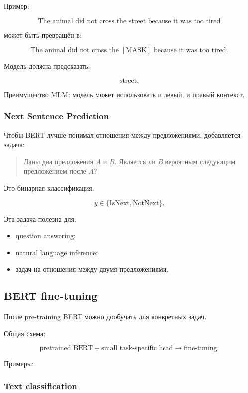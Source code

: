 \documentclass[a4paper,12pt]{article}
\begin{document}
Пример:

\[
\text{The animal did not cross the street because it was too tired}
\]

может быть превращён в:

\[
\text{The animal did not cross the } [\text{MASK}] \text{ because it was too tired}.
\]

Модель должна предсказать:

\[
\text{street}.
\]

Преимущество MLM: модель может использовать и левый, и правый контекст.

\subsubsection{Next Sentence Prediction}

Чтобы BERT лучше понимал отношения между предложениями, добавляется задача:

\begin{quote}
Даны два предложения \(A\) и \(B\). Является ли \(B\) вероятным следующим предложением после \(A\)?
\end{quote}

Это бинарная классификация:

\[
y \in \{\text{IsNext}, \text{NotNext}\}.
\]

Эта задача полезна для:

\begin{itemize}
    \item question answering;
    \item natural language inference;
    \item задач на отношения между двумя предложениями.
\end{itemize}

\subsection{BERT fine-tuning}

После pre-training BERT можно дообучать для конкретных задач.

Общая схема:

\[
\text{pretrained BERT}
+
\text{small task-specific head}
\rightarrow
\text{fine-tuning}.
\]

Примеры:

\subsubsection{Text classification}
\end{document}
